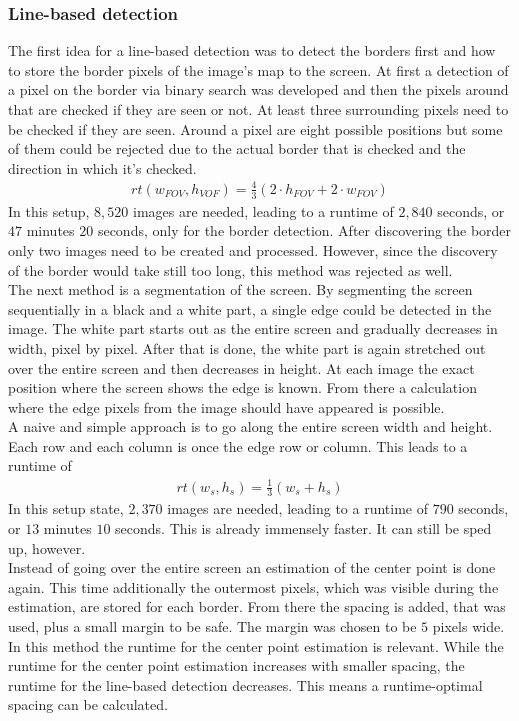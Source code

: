 \documentclass[journal,final,a4paper,twoside]{PS}
\begin{document}
\subsubsection{Line-based detection} 
\label{sec:linebased}
The first idea for a line-based detection was to detect the borders first and how to store the border pixels of the image's map to the screen. At first a detection of a pixel on the border via binary search was developed and then the pixels around that are checked if they are seen or not. At least three surrounding pixels need to be checked if they are seen. Around a pixel are eight possible positions but some of them could be rejected due to the actual border that is checked and the direction in which it's checked. 
\begin{align}
rt(w_{FOV}, h_{VOF}) = \frac{4}{3} (2 \cdot h_{FOV} + 2 \cdot w_{FOV})
\end{align}
In this setup, $8,520$ images are needed, leading to a runtime of $2,840$ seconds, or $47$ minutes $20$ seconds, only for the border detection. After discovering the border only two images need to be created and processed. However, since the discovery of the border would take still too long, this method was rejected as well.\\
The next method is a segmentation of the screen. By segmenting the screen sequentially in a black and a white part, a single edge could be detected in the image. The white part starts out as the entire screen and gradually decreases in width, pixel by pixel. After that is done, the white part is again stretched out over the entire screen and then decreases in height. At each image the exact position where the screen shows the edge is known. From there a calculation where the edge pixels from the image should have appeared is possible.\\
A naive and simple approach is to go along the entire screen width and height. Each row and each column is once the edge row or column. This leads to a runtime of
\begin{align}
rt(w_s, h_s) = \frac{1}{3} (w_s + h_s)
\end{align}
In this setup state,  $2,370$ images are needed, leading to a runtime of $790$ seconds, or $13$ minutes $10$ seconds.  This is already immensely faster. It can still be sped up, however.\\
Instead of going over the entire screen an estimation of the center point is done again. This time additionally the outermost pixels, which was visible during the estimation, are stored for each border. From there the spacing is added, that was used, plus a small margin to be safe. The margin was chosen to be $5$ pixels wide. In this method the runtime for the center point estimation is relevant. While the runtime for the center point estimation increases with smaller spacing, the runtime for the line-based detection decreases. This means a runtime-optimal spacing can be calculated.\\
\end{document}
